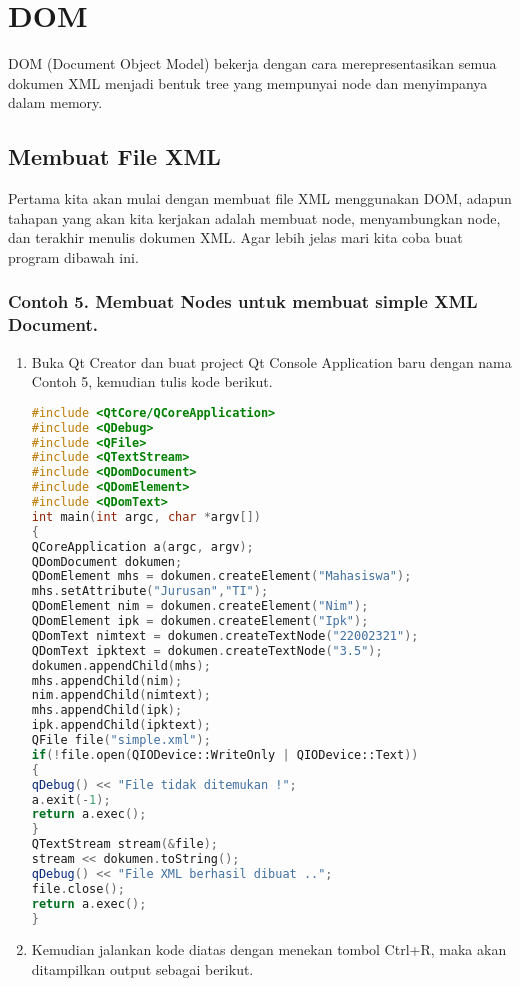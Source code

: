 \section{DOM}\label{dom}

DOM (Document Object Model) bekerja dengan cara merepresentasikan semua
dokumen XML menjadi bentuk tree yang mempunyai node dan menyimpanya
dalam memory.

\subsection{Membuat File XML}\label{membuat-file-xml}

Pertama kita akan mulai dengan membuat file XML menggunakan DOM, adapun
tahapan yang akan kita kerjakan adalah membuat node, menyambungkan node,
dan terakhir menulis dokumen XML. Agar lebih jelas mari kita coba buat
program dibawah ini.

\subsubsection*{Contoh 5. Membuat Nodes untuk membuat simple XML Document.}

\begin{enumerate}
\def\labelenumi{\arabic{enumi}.}
\item
  Buka Qt Creator dan buat project Qt Console Application baru dengan
  nama Contoh 5, kemudian tulis kode berikut.

\begin{lstlisting}[language=c++]
#include <QtCore/QCoreApplication>
#include <QDebug>
#include <QFile>
#include <QTextStream>
#include <QDomDocument>
#include <QDomElement>
#include <QDomText>
int main(int argc, char *argv[])
{
QCoreApplication a(argc, argv);
QDomDocument dokumen;
QDomElement mhs = dokumen.createElement("Mahasiswa");
mhs.setAttribute("Jurusan","TI");
QDomElement nim = dokumen.createElement("Nim");
QDomElement ipk = dokumen.createElement("Ipk");
QDomText nimtext = dokumen.createTextNode("22002321");
QDomText ipktext = dokumen.createTextNode("3.5");
dokumen.appendChild(mhs);
mhs.appendChild(nim);
nim.appendChild(nimtext);
mhs.appendChild(ipk);
ipk.appendChild(ipktext);
QFile file("simple.xml");
if(!file.open(QIODevice::WriteOnly | QIODevice::Text))
{
qDebug() << "File tidak ditemukan !";
a.exit(-1);
return a.exec();
}
QTextStream stream(&file);
stream << dokumen.toString();
qDebug() << "File XML berhasil dibuat ..";
file.close();
return a.exec();
}
\end{lstlisting}
\item
  Kemudian jalankan kode diatas dengan menekan tombol Ctrl+R, maka akan
  ditampilkan output sebagai berikut.
\end{enumerate}

